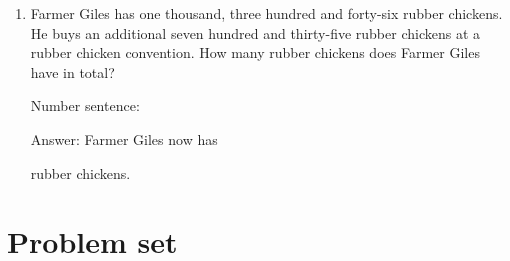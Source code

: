 \documentclass{tufte-book}
\begin{document}
\begin{enumerate}
  \item Farmer Giles has one thousand, three hundred and forty-six rubber chickens. He buys an additional
  seven hundred and thirty-five rubber chickens at a rubber chicken convention.
  How many rubber chickens does Farmer Giles have in total?\bigskip\par
Number sentence: \dotfill\bigskip\par
Answer: Farmer Giles now has 
\dotfill\bigskip\par\mbox{}\dotfill\bigskip\par\mbox{}\dotfill\bigskip
 rubber chickens.
\end{enumerate}

\clearpage\section{Problem set }
\end{document}

